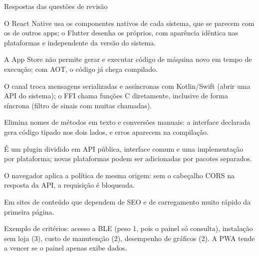 \documentclass[aspectratio=169,10pt]{beamer}
\begin{document}
\begin{frame}{Respostas das questões de revisão}
  \begin{respostas}
    \item O React Native usa os componentes nativos de cada sistema, que se parecem com os de outros apps; o Flutter desenha os próprios, com aparência idêntica nas plataformas e independente da versão do sistema.
    \item A App Store não permite gerar e executar código de máquina novo em tempo de execução; com AOT, o código já chega compilado.
    \item O canal troca mensagens serializadas e assíncronas com Kotlin/Swift (abrir uma API do sistema); o FFI chama funções C diretamente, inclusive de forma síncrona (filtro de sinais com muitas chamadas).
    \item Elimina nomes de métodos em texto e conversões manuais: a interface declarada gera código tipado nos dois lados, e erros aparecem na compilação.
    \item É um plugin dividido em API pública, interface comum e uma implementação por plataforma; novas plataformas podem ser adicionadas por pacotes separados.
    \item O navegador aplica a política de mesma origem: sem o cabeçalho CORS na resposta da API, a requisição é bloqueada.
    \item Em sites de conteúdo que dependem de SEO e de carregamento muito rápido da primeira página.
    \item Exemplo de critérios: acesso a BLE (peso 1, pois o painel só consulta), instalação sem loja (3), custo de manutenção (2), desempenho de gráficos (2). A PWA tende a vencer se o painel apenas exibe dados.
  \end{respostas}
\end{frame}

\end{document}
